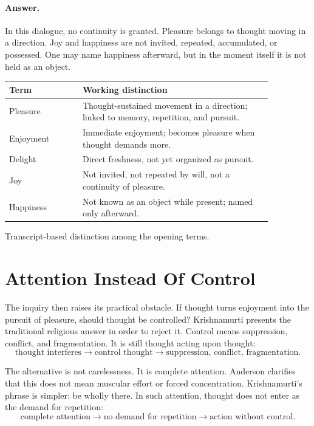 \documentclass[11pt,oneside]{book}
\begin{document}
\paragraph{Answer.}
In this dialogue, no continuity is granted. Pleasure belongs to thought moving in a direction. Joy and happiness are not invited, repeated, accumulated, or possessed. One may name happiness afterward, but in the moment itself it is not held as an object.

\begin{table}
\centering
\begin{tabular}{|p{0.24\linewidth}|p{0.62\linewidth}|}
\hline
\textbf{Term} & \textbf{Working distinction} \\
\hline
Pleasure & Thought-sustained movement in a direction; linked to memory, repetition, and pursuit. \\
\hline
Enjoyment & Immediate enjoyment; becomes pleasure when thought demands more. \\
\hline
Delight & Direct freshness, not yet organized as pursuit. \\
\hline
Joy & Not invited, not repeated by will, not a continuity of pleasure. \\
\hline
Happiness & Not known as an object while present; named only afterward. \\
\hline
\end{tabular}

Transcript-based distinction among the opening terms.
\end{table}

\section{Attention Instead Of Control}

The inquiry then raises its practical obstacle. If thought turns enjoyment into the pursuit of pleasure, should thought be controlled? Krishnamurti presents the traditional religious answer in order to reject it. Control means suppression, conflict, and fragmentation. It is still thought acting upon thought:
\begin{equation}
\text{thought interferes}
\longrightarrow
\text{control thought}
\longrightarrow
\text{suppression, conflict, fragmentation}.
\end{equation}

The alternative is not carelessness. It is complete attention. Anderson clarifies that this does not mean muscular effort or forced concentration. Krishnamurti's phrase is simpler: be wholly there. In such attention, thought does not enter as the demand for repetition:
\begin{equation}
\text{complete attention}
\longrightarrow
\text{no demand for repetition}
\longrightarrow
\text{action without control}.
\end{equation}
\end{document}
